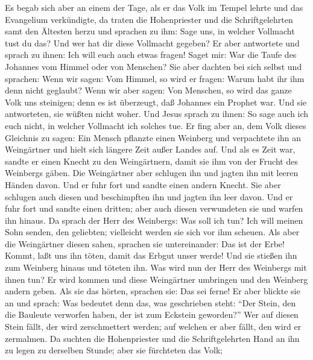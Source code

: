  Es begab sich aber an einem der Tage, als er das Volk im
Tempel lehrte und das Evangelium verkündigte, da traten die
Hohenpriester und die Schriftgelehrten samt den Ältesten herzu
 und sprachen zu ihm: Sage uns, in welcher Vollmacht tust
du das? Und wer hat dir diese Vollmacht gegeben?  Er aber
antwortete und sprach zu ihnen: Ich will euch auch etwas fragen! Saget
mir:  War die Taufe des Johannes vom Himmel oder von
Menschen?  Sie aber dachten bei sich selbst und sprachen:
Wenn wir sagen: Vom Himmel, so wird er fragen: Warum habt ihr ihm denn
nicht geglaubt?  Wenn wir aber sagen: Von Menschen, so
wird das ganze Volk uns steinigen; denn es ist überzeugt, daß Johannes
ein Prophet war.  Und sie antworteten, sie wüßten nicht
woher.  Und Jesus sprach zu ihnen: So sage auch ich euch
nicht, in welcher Vollmacht ich solches tue.  Er fing aber
an, dem Volk dieses Gleichnis zu sagen: Ein Mensch pflanzte einen
Weinberg und verpachtete ihn an Weingärtner und hielt sich längere Zeit
außer Landes auf.  Und als es Zeit war, sandte er einen
Knecht zu den Weingärtnern, damit sie ihm von der Frucht des Weinbergs
gäben. Die Weingärtner aber schlugen ihn und jagten ihn mit leeren
Händen davon.  Und er fuhr fort und sandte einen andern
Knecht. Sie aber schlugen auch diesen und beschimpften ihn und jagten
ihn leer davon.  Und er fuhr fort und sandte einen
dritten; aber auch diesen verwundeten sie und warfen ihn hinaus.
 Da sprach der Herr des Weinbergs: Was soll ich tun? Ich
will meinen Sohn senden, den geliebten; vielleicht werden sie sich vor
ihm scheuen.  Als aber die Weingärtner diesen sahen,
sprachen sie untereinander: Das ist der Erbe! Kommt, laßt uns ihn töten,
damit das Erbgut unser werde!  Und sie stießen ihn zum
Weinberg hinaus und töteten ihn. Was wird nun der Herr des Weinbergs mit
ihnen tun?  Er wird kommen und diese Weingärtner
umbringen und den Weinberg andern geben. Als sie das hörten, sprachen
sie: Das sei ferne!  Er aber blickte sie an und sprach:
Was bedeutet denn das, was geschrieben steht: ``Der Stein, den die
Bauleute verworfen haben, der ist zum Eckstein geworden?''
 Wer auf diesen Stein fällt, der wird zerschmettert
werden; auf welchen er aber fällt, den wird er zermalmen.
 Da suchten die Hohenpriester und die Schriftgelehrten
Hand an ihn zu legen zu derselben Stunde; aber sie fürchteten das Volk;

